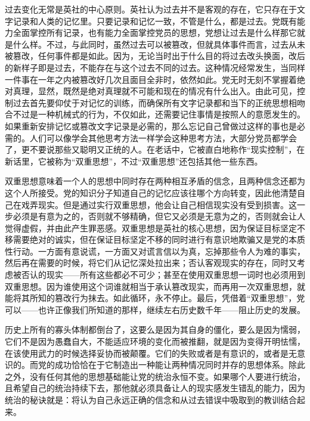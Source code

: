 过去变化无常是英社的中心原则。英社认为过去并不是客观的存在，它只存在于文字记录和人类的记忆里。只要记录和记忆一致，不管是什么，都是过去。党既有能力全面掌控所有记录，也有能力全面掌控党员的思想，党想让过去是什么样那它就是什么样。不过，与此同时，虽然过去可以被篡改，但就具体事件而言，过去从未被篡改，任何事件都是如此。因为，无论当时出于什么目的将过去改头换面，改后的新样子即是过去，不能存在与这个过去不同的过去。这种情况经常发生，当同样一件事在一年之内被篡改好几次且面目全非时，依然如此。党无时无刻不掌握着绝对真理，显然，既然是绝对真理就不可能和现在的情况有什么出入。由此可见，控制过去首先要仰仗于对记忆的训练，而确保所有文字记录都和当下的正统思想相吻合不过是一种机械式的行为，不仅如此，还需要记住事情是按照人的意愿发生的。如果重新安排记忆或篡改文字记录是必需的，那么忘记自己曾做过这样的事也是必需的。人们可以像学会其他思考方法一样学会这种思考方法，大部分党员都学会了，更不要说那些又聪明又正统的人。在老话中，它被直白地称作``现实控制''，在新话里，它被称为``双重思想''，不过``双重思想''还包括其他一些东西。

双重思想意味着一个人的思想中同时存在两种相互矛盾的信念，且两种信念还都为这个人所接受。党的知识分子知道自己的记忆应该往哪个方向转变，因此他清楚自己在戏弄现实。但是通过实行双重思想，他会让自己相信现实没有受到损害。这一步必须是有意为之的，否则就不够精确，但它又必须是无意为之的，否则就会让人觉得虚假，并由此产生罪恶感。双重思想是英社的核心思想，因为保证目标坚定不移需要绝对的诚实，但在保证目标坚定不移的同时进行有意识地欺骗又是党的本质性行动。一方面有意说谎，一方面又对谎言信以为真，忘掉那些令人为难的事实，然后再在需要的时候，将它们从记忆深处拉出来；否认客观现实的存在，同时又考虑被否认的现实——所有这些都必不可少；甚至在使用双重思想一词时也必须用到双重思想。因为谁使用这个词谁就相当于承认篡改现实，而再用一次双重思想，就能将其所知的篡改行为抹去。如此循环，永不停止。最后，凭借着``双重思想''，党可以——也许正像我们所知道的那样，继续左右历史数千年——阻止历史的发展。

历史上所有的寡头体制都倒台了，这要么是因为其自身的僵化，要么是因为懦弱，它们不是因为愚蠢自大，不能适应环境的变化而被推翻，就是因为变得开明怯懦，在该使用武力的时候选择妥协而被颠覆。它们的失败或者是有意识的，或者是无意识的。而党的成功恰恰在于它制造出一种能让两种情况同时并存的思想体系。除此之外，没有任何其他的思想基础能让党的统治永恒不变。如果哪个人要进行统治，且希望自己的统治持续下去，那他就必须具备让人的现实感发生错乱的能力，因为统治的秘诀就是：将认为自己永远正确的信念和从过去错误中吸取到的教训结合起来。

